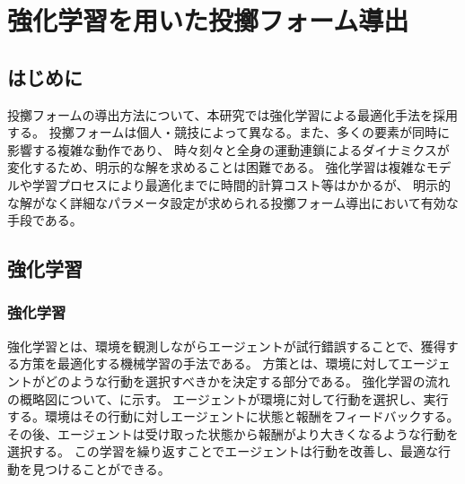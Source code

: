\chapter[強化学習を用いた投擲フォーム導出]{強化学習を用いた投擲フォーム導出}

\section{はじめに}
投擲フォームの導出方法について、本研究では強化学習による最適化手法を採用する。
投擲フォームは個人・競技によって異なる。また、多くの要素が同時に影響する複雑な動作であり、
時々刻々と全身の運動連鎖によるダイナミクスが変化するため、明示的な解を求めることは困難である。
強化学習は複雑なモデルや学習プロセスにより最適化までに時間的計算コスト等はかかるが、
明示的な解がなく詳細なパラメータ設定が求められる投擲フォーム導出において有効な手段である。

\section{強化学習}
\subsection{強化学習}
強化学習とは、環境を観測しながらエージェントが試行錯誤することで、獲得する方策を最適化する機械学習の手法である。
方策とは、環境に対してエージェントがどのような行動を選択すべきかを決定する部分である。
強化学習の流れの概略図について、に示す。
エージェントが環境に対して行動を選択し、実行する。環境はその行動に対しエージェントに状態と報酬をフィードバックする。
その後、エージェントは受け取った状態から報酬がより大きくなるような行動を選択する。
この学習を繰り返すことでエージェントは行動を改善し、最適な行動を見つけることができる。
